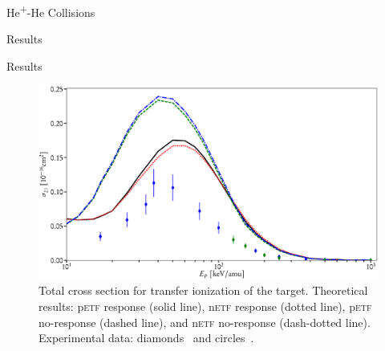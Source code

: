 \documentclass[letterpaper, 11 pt]{report}
\begin{document}
\begin{chapter}{\texorpdfstring{He\textsuperscript{+}}{He+}-He Collisions \label{chap:hephe}}
\begin{section}{Results \label{sec:hephe-disc}}
\begin{subsection}{Results \label{sec:hephe-res}}
         \begin{figure}[t]
            \centering
            \includegraphics[width = \linewidth]{./images/hephe-cross/HepHe-021.eps}
            \caption[Total cross section for transfer ionization of the target in
                     He\textsuperscript{+}-He collisions.]
                     {Total cross section for transfer ionization of the target.
                     Theoretical results: p\textsc{etf} response (solid line), n\textsc{etf} response
                                          (dotted line), p\textsc{etf} no-response (dashed line), and
                                          n\textsc{etf} no-response (dash-dotted line).
                     Experimental data: diamonds~\cite{Dub-89} and circles~\cite{FTFHLP-95}.
                     \label{fig:cs021}}
         \end{figure}


\end{subsection}
\end{section}
\end{chapter}
\end{document}
